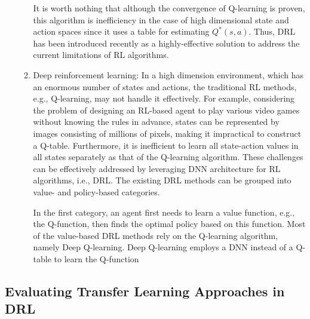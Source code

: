 \documentclass[letterpaper%
, oneside%
, 12pt%
,thesepararticles%
, english%
,creativecommons,hyperref, withAlgo2e%
]{thETS}
\begin{document}
\begin{enumerate}
\begin{enumerate}
{It is worth nothing that although the convergence of Q-learning is proven, this algorithm is inefficiency in the case of high dimensional state and action spaces since it uses a table for estimating $\displaystyle Q^{*}( s,a)$. Thus, DRL has been introduced recently as a highly-effective solution to address the current limitations of RL algorithms.
}	     	
\item{
Deep reinforcement learning: In a high dimension environment, which has an enormous number of states and actions, the traditional RL methods, e.g., Q-learning, may not handle it effectively. For example, considering the problem of designing an RL-based agent to play various video games without knowing the rules in advance, states can be represented by images consisting of millions of pixels, making it impractical to construct a Q-table. Furthermore, it is inefficient to learn all state-action values in all states separately as that of the Q-learning algorithm. These challenges can be effectively addressed by leveraging DNN architecture for RL algorithms, i.e., DRL. The existing DRL methods can be grouped into value- and policy-based categories.

In the first category, an agent first needs to learn a value function, e.g., the Q-function, then finds the optimal policy based on this function. Most of the value-based DRL methods rely on the Q-learning algorithm, namely Deep Q-learning. Deep Q-learning employs a DNN instead of a Q-table to learn the Q-function

}
	\end{enumerate} 
\end{enumerate}


\subsection{Evaluating Transfer Learning Approaches in DRL}
\end{document}
